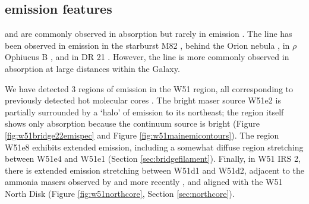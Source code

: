 



\subsection{\formaldehyde emission features}



\formaldehyde \oneone and \twotwo are commonly observed in absorption
but rarely in emission \citep[e.g.][]{Mangum1993a,Araya2007b}.  The \twotwo
line has been observed in emission in the starburst M82 \citep{Mangum2008a},
behind the Orion nebula
\citep{Evans1975a,Kutner1976a,Batrla1983a,Johnston1983a,Bastien1985a,Wilson1989a},
in $\rho$ Ophiucus B
\citep{Loren1980a,Loren1983a,Martin-Pintado1983a,Wadiak1985a}, and in DR 21
\citep{Wilson1982a,Johnston1984a}.  However, the \twotwo line is more commonly
observed in absorption at large distances within the Galaxy.

We have detected 3 regions of \twotwo emission in the W51 region, all
corresponding to previously detected hot molecular cores
\citep{Zhang1997a,Shi2010a,Shi2010b,Goddi2015a}.  The bright
maser source W51e2 is partially surrounded by a `halo' of \formaldehyde \twotwo
emission to its northeast; the \hchii region itself shows only \twotwo
absorption because the continuum source is bright
(Figure \ref{fig:w51bridge22emispec} and Figure \ref{fig:w51mainemicontours}).
The \hchii region W51e8 exhibits extended \twotwo emission, including a
somewhat
diffuse region stretching between W51e4 and W51e1 (Section
\ref{sec:bridgefilament}).  Finally, in W51 IRS 2, there is extended \twotwo
emission stretching between W51d1 and W51d2, adjacent to the ammonia masers
observed by \citet{Zhang1995a} and more recently \citet{Goddi2015a}, and
aligned with the \citet{Zapata2010a} W51 North Disk (Figure
\ref{fig:w51northcore}, Section \ref{sec:northcore}).

